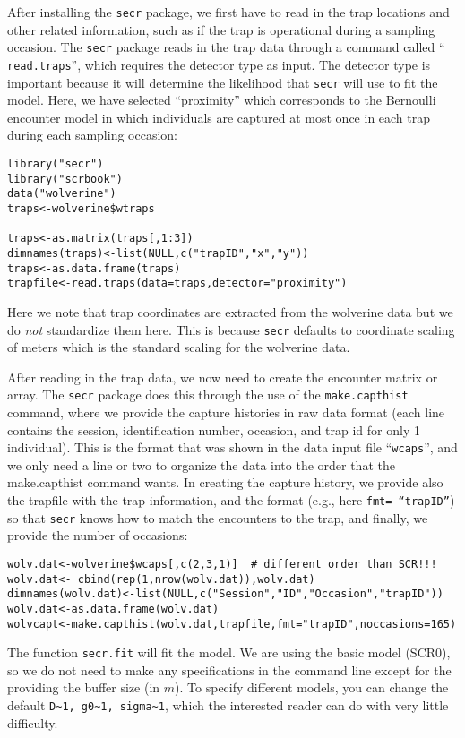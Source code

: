 After installing the \mbox{\tt secr} package, we first have to read in
the trap locations and other related information, such as if the trap
is operational during a sampling occasion.  The \mbox{\tt secr}
package reads in the trap data through a command called ``\mbox{\tt
  read.traps}'', which requires the detector type as input.  The
detector type is important because it will determine the likelihood
that \mbox{\tt secr} will use to fit the model.  Here, we have
selected ``proximity'' which corresponds to the Bernoulli encounter
model in which individuals are captured at most once in each trap
during each sampling occasion: 
{\small
\begin{verbatim}
library("secr")
library("scrbook")
data("wolverine")
traps<-wolverine$wtraps

traps<-as.matrix(traps[,1:3])
dimnames(traps)<-list(NULL,c("trapID","x","y"))
traps<-as.data.frame(traps)
trapfile<-read.traps(data=traps,detector="proximity")
\end{verbatim}
}
Here we note that trap coordinates are extracted from the wolverine
data but we do {\it not} standardize them here. This is because
\mbox{\tt secr} defaults to coordinate scaling of meters which is the
standard scaling for the wolverine data. 

After reading in the trap data, we now need to create the encounter matrix
or array.  The \mbox{\tt secr} package does this through the use of the
\mbox{\tt make.capthist} command, where we provide the capture histories in raw
data format (each line contains the session, identification number,
occasion, and trap id for only 1 individual).  This is the format that
was shown in the data input file ``\mbox{\tt wcaps}'', and we only need a line or
two to organize the data into the order that the make.capthist command
wants.  In creating the capture history, we provide also the trapfile
with the trap information, and the format (e.g., here \mbox{\tt fmt= ``trapID''})
so that \mbox{\tt secr} knows how to match the encounters to the trap, and
finally, we provide the number of occasions:
{\small 
\begin{verbatim}
wolv.dat<-wolverine$wcaps[,c(2,3,1)]  # different order than SCR!!!
wolv.dat<- cbind(rep(1,nrow(wolv.dat)),wolv.dat)
dimnames(wolv.dat)<-list(NULL,c("Session","ID","Occasion","trapID"))
wolv.dat<-as.data.frame(wolv.dat)
wolvcapt<-make.capthist(wolv.dat,trapfile,fmt="trapID",noccasions=165)
\end{verbatim}
}
The function  \mbox{\tt secr.fit} will fit the model. We are using the
basic model (SCR0), so we do not need to make any specifications in
the command line except for the providing the buffer size (in $m$).  To
specify different models, you can change the default
\verb#D~1, g0~1, sigma~1#, which the interested reader can do with
very little difficulty.

